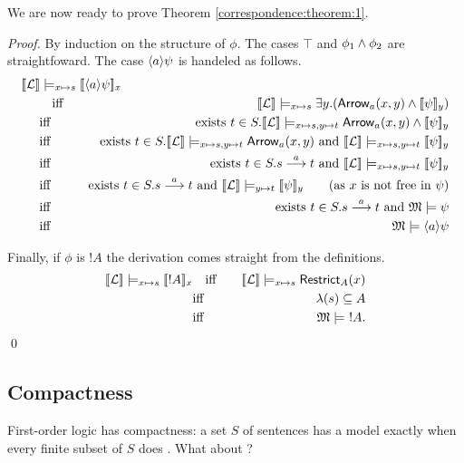 \NI We are now ready to prove Theorem \ref{correspondence:theorem:1}.
\begin{proof}
By induction on the structure of $\phi$. The cases $\top$ and $\phi_1
\land \phi_2$ are straightfoward.  The case $\langle a \rangle \psi$ is handeled
as follows.
\begin{eqnarray*}
  \lefteqn{
  \SEMB{\LLL} \models_{x \mapsto s} \SEMB{\MAY{a}\psi}_x}\hspace{5mm} 
     \\
     &\quad \text{iff}\quad &
  \SEMB{\LLL} \models_{x \mapsto s} \exists y.(\ARROW{a}{x}{y} \AND \SEMB{\psi}_y) 
     \\
     &\text{iff}&
  \text{exists}\ t \in S. \SEMB{\LLL} \models_{x \mapsto s, y \mapsto t} \ARROW{a}{x}{y} \AND \SEMB{\psi}_y
     \\
     &\text{iff}&
  \text{exists}\ t \in S. \SEMB{\LLL} \models_{x \mapsto s, y \mapsto t} \ARROW{a}{x}{y} \ \text{and}\ \SEMB{\LLL} \models_{x \mapsto s, y \mapsto t}  \SEMB{\psi}_y
     \\
     &\text{iff}&
  \text{exists}\ t \in S. s \TRANS{a} t \ \text{and}\ \SEMB{\LLL} \models_{x \mapsto s, y \mapsto t}  \SEMB{\psi}_y
     \\
     &\text{iff}&
  \text{exists}\ t \in S. s \TRANS{a} t \ \text{and}\ \SEMB{\LLL} \models_{y \mapsto t}  \SEMB{\psi}_y \qquad (\text{as $x$ is not free in $\psi$})
     \\
     &\text{iff}&
  \text{exists}\ t \in S. s \TRANS{a} t \ \text{and}\ \MMM \models \psi
     \\
     &\text{iff}&
  \MMM \models \MAY{a}\psi  
\end{eqnarray*}

\NI Finally, if $\phi$ is $!A$ the derivation comes straight from the
definitions.
\begin{eqnarray*}
  \lbrack\!\lbrack \mathcal{L} \rbrack\!\rbrack \models_{x \mapsto s} \lbrack\!\lbrack !A \rbrack\!\rbrack_x
    &\quad \text{iff}\quad &
  \lbrack\!\lbrack \mathcal{L} \rbrack\!\rbrack \models_{x \mapsto s} \mathsf{Restrict}_{A}(x)
     \\
     &\text{iff}&
  \lambda(s) \subseteq A
     \\
     &\text{iff}&
  \frak{M} \models\ !A.
\end{eqnarray*}
\qed
\end{proof}

\subsection{Compactness}

\NI First-order logic has compactness: a set $S$ of sentences has a
model exactly when every finite subset of $S$ does \cite[Chapter
  4.3]{EndertonHB:matinttl}. What about \ELABR{}? 

